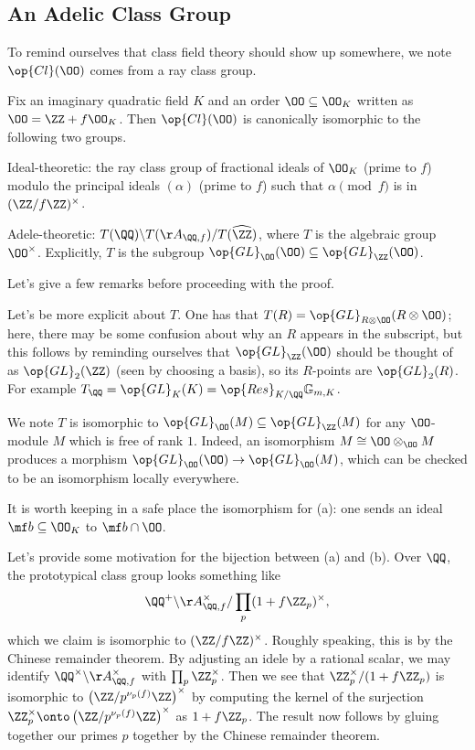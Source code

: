 \documentclass[../notes.tex]{subfiles}
\begin{document}
\subsection{An Adelic Class Group}
To remind ourselves that class field theory should show up somewhere, we note $\op{Cl}(\OO)$ comes from a ray class group.
\begin{proposition} \label{prop:better-order-class-group}
	Fix an imaginary quadratic field $K$ and an order $\OO\subseteq\OO_K$ written as $\OO=\ZZ+f\OO_K$. Then $\op{Cl}(\OO)$ is canonically isomorphic to the following two groups.
	\begin{listalph}
		\item Ideal-theoretic: the ray class group of fractional ideals of $\OO_K$ (prime to $f$) modulo the principal ideals $(\alpha)$ (prime to $f$) such that $\alpha\pmod f$ is in $(\ZZ/f\ZZ)^\times$.
		\item Adele-theoretic: $T(\QQ)\backslash T(\AA_{\QQ,f})/T(\widehat\ZZ)$, where $T$ is the algebraic group $\OO^\times$. Explicitly, $T$ is the subgroup $\op{GL}_\OO(\OO)\subseteq\op{GL}_\ZZ(\OO)$.
	\end{listalph}
\end{proposition}
Let's give a few remarks before proceeding with the proof.
\begin{remark} \label{rem:explicit-torus-order}
	Let's be more explicit about $T$. One has that $T(R)=\op{GL}_{R\otimes\OO}(R\otimes\OO)$; here, there may be some confusion about why an $R$ appears in the subscript, but this follows by reminding ourselves that $\op{GL}_\ZZ(\OO)$ should be thought of as $\op{GL}_2(\ZZ)$ (seen by choosing a basis), so its $R$-points are $\op{GL}_2(R)$. For example $T_\QQ=\op{GL}_K(K)=\op{Res}_{K/\QQ}\mathbb G_{m,K}$.
\end{remark}
\begin{remark}
	We note $T$ is isomorphic to $\op{GL}_\OO(M)\subseteq\op{GL}_\ZZ(M)$ for any $\OO$-module $M$ which is free of rank $1$. Indeed, an isomorphism $M\cong\OO\otimes_\OO M$ produces a morphism $\op{GL}_\OO(\OO)\to\op{GL}_\OO(M)$, which can be checked to be an isomorphism locally everywhere.
\end{remark}
\begin{remark}
	It is worth keeping in a safe place the isomorphism for (a): one sends an ideal $\mf b\subseteq\OO_K$ to $\mf b\cap\OO$.
\end{remark}
\begin{remark} \label{rem:idele-double-quotient-example}
	Let's provide some motivation for the bijection between (a) and (b). Over $\QQ$, the prototypical class group looks something like
	\[\QQ^+\backslash\AA_{\QQ,f}^\times/\prod_p(1+f\ZZ_p)^\times,\]
	which we claim is isomorphic to $(\ZZ/f\ZZ)^\times$. Roughly speaking, this is by the Chinese remainder theorem. By adjusting an idele by a rational scalar, we may identify $\QQ^\times\backslash\AA_{\QQ,f}^\times$ with $\prod_p\ZZ_p^\times$. Then we see that $\ZZ_p^\times/(1+f\ZZ_p)$ is isomorphic to $\left(\ZZ/p^{\nu_p(f)}\ZZ\right)^\times$ by computing the kernel of the surjection $\ZZ_p^\times\onto\left(\ZZ/p^{\nu_p(f)}\ZZ\right)^\times$ as $1+f\ZZ_p$. The result now follows by gluing together our primes $p$ together by the Chinese remainder theorem.
\end{remark}
\end{document}
